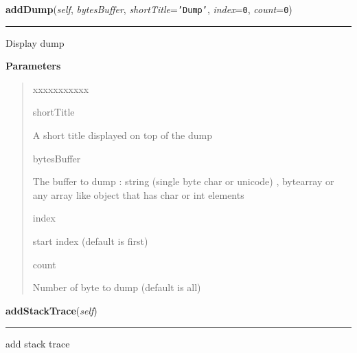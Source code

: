 \hspace{.8\funcindent}\begin{boxedminipage}{\funcwidth}

    \raggedright \textbf{addDump}(\textit{self}, \textit{bytesBuffer}, \textit{shortTitle}={\tt \texttt{'}\texttt{Dump}\texttt{'}}, \textit{index}={\tt 0}, \textit{count}={\tt 0})

    \vspace{-1.5ex}

    \rule{\textwidth}{0.5\fboxrule}
\setlength{\parskip}{2ex}
    Display dump

\setlength{\parskip}{1ex}
      \textbf{Parameters}
      \vspace{-1ex}

      \begin{quote}
        \begin{Ventry}{xxxxxxxxxxx}

          \item[shortTitle]

          A short title displayed on top of the dump

          \item[bytesBuffer]

          The buffer to dump : string (single byte char or unicode) , 
          bytearray or any array like object that has char or int elements

          \item[index]

          start index (default is first)

          \item[count]

          Number of byte to dump (default is all)

        \end{Ventry}

      \end{quote}

    \end{boxedminipage}

    \label{tracetool:TraceNodeEx:addStackTrace}

    \vspace{0.5ex}

\hspace{.8\funcindent}\begin{boxedminipage}{\funcwidth}

    \raggedright \textbf{addStackTrace}(\textit{self})

    \vspace{-1.5ex}

    \rule{\textwidth}{0.5\fboxrule}
\setlength{\parskip}{2ex}
    add stack trace

\setlength{\parskip}{1ex}
    \end{boxedminipage}

